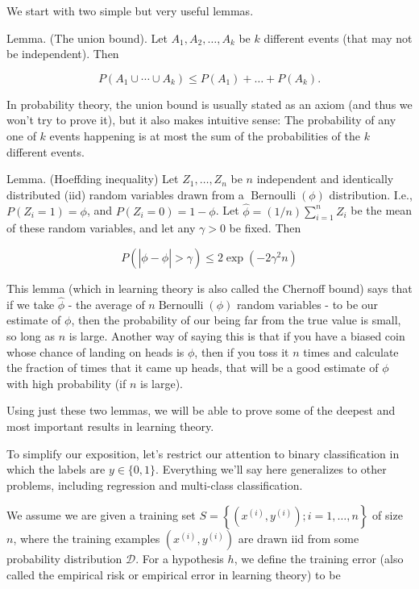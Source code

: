 \documentclass[10pt]{article}
\begin{document}
We start with two simple but very useful lemmas.

Lemma. (The union bound). Let \(A_{1}, A_{2}, \ldots, A_{k}\) be \(k\) different events (that may not be independent). Then

\[
P\left(A_{1} \cup \cdots \cup A_{k}\right) \leq P\left(A_{1}\right)+\ldots+P\left(A_{k}\right) .
\]

In probability theory, the union bound is usually stated as an axiom (and thus we won't try to prove it), but it also makes intuitive sense: The probability of any one of \(k\) events happening is at most the sum of the probabilities of the \(k\) different events.

Lemma. (Hoeffding inequality) Let \(Z_{1}, \ldots, Z_{n}\) be \(n\) independent and identically distributed (iid) random variables drawn from a \(\operatorname{Bernoulli}(\phi)\) distribution. I.e., \(P\left(Z_{i}=1\right)=\phi\), and \(P\left(Z_{i}=0\right)=1-\phi\). Let \(\hat{\phi}=(1 / n) \sum_{i=1}^{n} Z_{i}\) be the mean of these random variables, and let any \(\gamma>0\) be fixed. Then

\[
P(|\phi-\hat{\phi}|>\gamma) \leq 2 \exp \left(-2 \gamma^{2} n\right)
\]

This lemma (which in learning theory is also called the Chernoff bound) says that if we take \(\hat{\phi}\) - the average of \(n \operatorname{Bernoulli}(\phi)\) random variables - to be our estimate of \(\phi\), then the probability of our being far from the true value is small, so long as \(n\) is large. Another way of saying this is that if you have a biased coin whose chance of landing on heads is \(\phi\), then if you toss it \(n\) times and calculate the fraction of times that it came up heads, that will be a good estimate of \(\phi\) with high probability (if \(n\) is large).

Using just these two lemmas, we will be able to prove some of the deepest and most important results in learning theory.

To simplify our exposition, let's restrict our attention to binary classification in which the labels are \(y \in\{0,1\}\). Everything we'll say here generalizes to other problems, including regression and multi-class classification.

We assume we are given a training set \(S=\left\{\left(x^{(i)}, y^{(i)}\right) ; i=1, \ldots, n\right\}\) of size \(n\), where the training examples \(\left(x^{(i)}, y^{(i)}\right)\) are drawn iid from some probability distribution \(\mathcal{D}\). For a hypothesis \(h\), we define the training error (also called the empirical risk or empirical error in learning theory) to be
\end{document}
